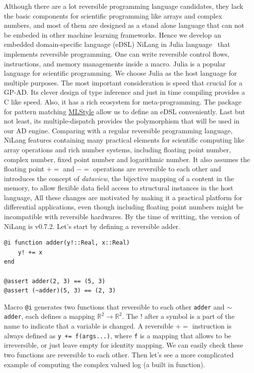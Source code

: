 \documentclass{article}
\newcommand{\<}{\langle}
\renewcommand{\>}{\rangle}
\theoremstyle{definition}\newtheorem{definition}{\textit{Definition}}
\begin{document}
    Although there are a lot reversible programming language candidates, they lack the basic components for scientific programming like arrays and complex numbers, and most of them are designed as a stand alone language that can not be embeded in other machine learning frameworks.
Hence we develop an embedded domain-specific language (eDSL) NiLang in Julia language~\cite{Bezanson2012,Bezanson2017} that implements reversible programming. One can write reversible control flows, instructions, and memory managements inside a macro.
Julia is a popular language for scientific programming. We choose Julia as the host language for multiple purposes. The most important consideration is speed that crucial for a GP-AD. Its clever design of type inference and just in time compiling provides a C like speed.
Also, it has a rich ecosystem for meta-programming. The package for pattern matching \href{https://github.com/thautwarm/MLStyle.jl}{MLStyle} allow us to define an eDSL conveniently. Last but not least, its multiple-dispatch provides the polymorphism that will be used in our AD engine.
Comparing with a regular reversible programming language, NiLang features containing many practical elements for scientific computing like array operations and rich number systems, including floating point number, complex number, fixed point number and logarithmic number.
It also assumes the floating point $\mathrel{+}=$ and $\mathrel{-}=$ operations are reversible to each other and introduces the concept of \textit{dataview}, the bijective mapping of a content in the memory, to allow flexible data field access to structural instances in the host language,
All these changes are motivated by making it a practical platform for differential applications, even though including floating point numbers might be incompatible with reversible hardwares.
By the time of writting, the version of NiLang is v0.7.2.
Let's start by defining a reversible adder.

\begin{minipage}{.88\columnwidth}
\begin{lstlisting}[mathescape=true,caption={A reversible adder},label={lst:adder}]
@i function adder(y!::Real, x::Real)
    y! += x
end

@assert adder(2, 3) == (5, 3)
@assert (~adder)(5, 3) == (2, 3)
\end{lstlisting}
\end{minipage}

Macro \texttt{@i} generates two functions that reversible to each other \texttt{adder} and \texttt{$\sim$adder}, each defines a mapping $\mathbb{R}^2 \rightarrow \mathbb{R}^2$. The $!$ after a symbol is a part of the name to indicate that a variable is changed.
A reversible $\mathrel{+}=$ instruction is always defined as \texttt{y += f(args...)}, where \texttt{f} is a mapping that allows to be irreversible, or just leave empty for identity mapping.
We can easily check these two functions are reversible to each other.
Then let's see a more complicated example of computing the complex valued log (a built in function).
\end{document}
